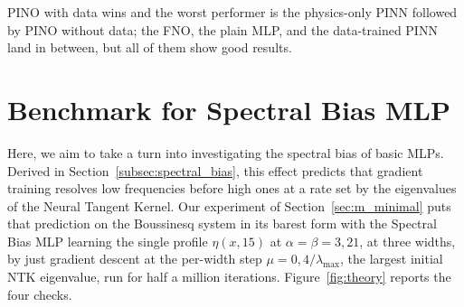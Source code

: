 PINO with data wins and the worst performer is the physics-only PINN followed by PINO without data; the FNO, the plain MLP, and the data-trained PINN land in between, but all of them show good results.

\section{Benchmark for Spectral Bias MLP}
\label{sec:r_bias}

Here, we aim to take a turn into investigating the spectral bias of basic MLPs. Derived in Section~\ref{subsec:spectral_bias}, this effect predicts that gradient training resolves low frequencies before high ones at a rate set by the eigenvalues of the Neural Tangent Kernel. Our experiment of Section~\ref{sec:m_minimal} puts that prediction on the Boussinesq system in its barest form with the Spectral Bias MLP learning the single profile $\eta(x, 15)$ at $\alpha = \beta = 3{,}21$, at three widths, by just gradient descent at the per-width step $\mu = 0{,}4/\lambda_{\max}$, the largest initial NTK eigenvalue, run for half a million iterations. Figure~\ref{fig:theory} reports the four checks.

